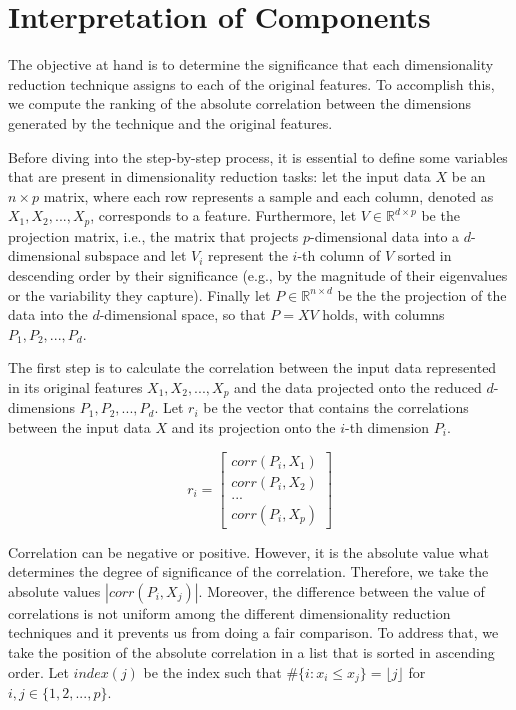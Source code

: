 \section{Interpretation of Components}

The objective at hand is to determine the significance that each dimensionality reduction technique assigns to each of the original features. To accomplish this, we compute the ranking of the absolute correlation between the dimensions generated by the technique and the original features.

Before diving into the step-by-step process, it is essential to define some variables that are present in dimensionality reduction tasks: let the input data $X$ be an $n \times p$ matrix, where each row represents a sample and each column, denoted as $X_1, X_2, ..., X_p$, corresponds to a feature. Furthermore, let $V \in \mathbb{R}^{d \times p}$ be the projection matrix, i.e., the matrix that projects $p$-dimensional data into a $d$-dimensional subspace and let $V_i$ represent the $i$-th column of $V$ sorted in descending order by their significance (e.g., by the magnitude of their eigenvalues or the variability they capture). Finally let $P \in \mathbb{R}^{n \times d}$ be the the projection of the data into the $d$-dimensional space, so that $P = XV$ holds, with columns $P_1, P_2,..., P_d$.

The first step is to calculate the correlation between the input data represented in its original features $X_1, X_2, ..., X_p$ and the data projected onto the reduced $d$-dimensions $P_1, P_2, ..., P_d$. Let $r_i$ be the vector that contains the correlations between the input data $X$ and its projection onto the $i$-th dimension $P_i$.

$$
    r_i =
    \begin{bmatrix}
        corr(P_i, X_1) \\
        corr(P_i, X_2) \\
        ...            \\
        corr(P_i, X_p)
    \end{bmatrix}
$$

Correlation can be negative or positive. However, it is the absolute value what determines the degree of significance of the correlation. Therefore, we take the absolute values $|corr(P_i,X_j)|$. Moreover, the difference between the value of correlations is not uniform among the different dimensionality reduction techniques and it prevents us from doing a fair comparison. To address that, we take the position of the absolute correlation in a list that is sorted in ascending order. Let $index(j)$ be the index such that $\#\{i : x_i \leq x_j\} = \lfloor j \rfloor$ for $i, j \in \{1,2,...,p\}$.

